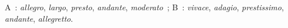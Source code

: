 A~: \emph{allegro}, \emph{largo}, \emph{presto}, \emph{andante}, \emph{moderato}~; B~: \emph{vivace}, \emph{adagio}, \emph{prestissimo}, \emph{andante}, \emph{allegretto}.
